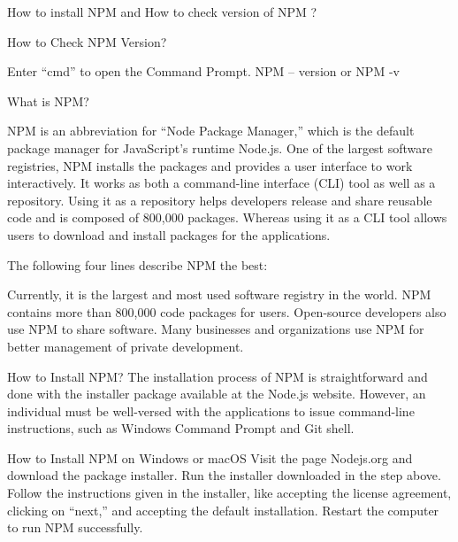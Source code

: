 How to install NPM and How to check version of NPM ?

How to Check NPM Version?

Enter “cmd” to open the Command Prompt.
NPM -- version or NPM -v 

What is NPM?

NPM is an abbreviation for “Node Package Manager,” which is the default 
package manager for JavaScript's runtime Node.js. One of the largest 
software registries, NPM installs the packages and provides a user interface 
to work interactively. 
It works as both a command-line interface (CLI) tool as well as a repository. 
Using it as a repository helps developers release and share reusable code and 
is composed of 800,000 packages. Whereas using it as a CLI tool allows users to 
download and install packages for the applications.

The following four lines describe NPM the best:

Currently, it is the largest and most used software registry in the world.
NPM contains more than 800,000 code packages for users.
Open-source developers also use NPM to share software.
Many businesses and organizations use NPM for better management of private development.


How to Install NPM?
The installation process of NPM is straightforward and done with the 
installer package available at the Node.js website. However, an individual 
must be well-versed with the applications to issue command-line instructions, 
such as Windows Command Prompt and Git shell.

How to Install NPM on Windows or macOS
Visit the page Nodejs.org and download the package installer.
Run the installer downloaded in the step above.
Follow the instructions given in the installer, like accepting the license agreement, 
clicking on “next,” and accepting the default installation.
Restart the computer to run NPM successfully. 